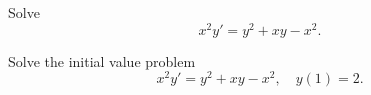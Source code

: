 \setcounter{example}{2}
\setcounter{equation}{8}
\begin{example}
  \label{example:2.4.3}\rm \mbox{}
  \newline
  \begin{alist}
    \item %
    Solve
    \begin{equation}
      \label{eq:2.4.9}x^{2}y'=y^{2}+xy-x^{2}.
    \end{equation}

    \item %
    Solve the initial value problem
    \begin{equation}
      \label{eq:2.4.10}x^{2}y'=y^{2}+xy-x^{2},\quad y(1)=2.
    \end{equation}
  \end{alist}
\end{example}
\setcounter{equation}{10}
\setcounter{figure}{2}
